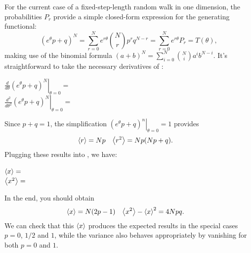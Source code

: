 For the current case of a fixed-step-length random walk in one dimension, the probabilities $P_r$ provide a simple closed-form expression for the generating functional:
\begin{equation}
  \label{eq:gen_func}
  \left(e^{\theta} p + q\right)^N = \sum_{r = 0}^N e^{r \theta} \binom{N}{r} p^r q^{N - r} = \sum_{r = 0}^N e^{r \theta} P_r = T(\theta),
\end{equation}
making use of the binomial formula $\left(a + b\right)^N = \sum_{i = 0}^N \binom{N}{i} a^i b^{N - i}$.
It's straightforward to take the necessary derivatives of :
\begin{mdframed}
  $\displaystyle \left.\frac{d}{d\theta} \left(e^{\theta} p + q\right)^N \right|_{\theta = 0} = $ \\[50 pt]
  $\displaystyle \left.\frac{d^2}{d\theta^2} \left(e^{\theta} p + q\right)^N \right|_{\theta = 0} = $ \\[50 pt]
\end{mdframed}
Since $p + q = 1$, the simplification $\left.\left(e^{\theta} p + q\right)^n \right|_{\theta = 0} = 1$ provides
\begin{align*}
  \left\langle r \right\rangle   & = Np &
  \left\langle r^2 \right\rangle & = Np(Np + q).
\end{align*}
\newpage %
\noindent Plugging these results into , we have:
\begin{mdframed}
  $\left\langle x \right\rangle   = $ \\[50 pt]
  $\left\langle x^2 \right\rangle = $ \\[50 pt]
\end{mdframed}
In the end, you should obtain
\begin{align}
  \label{eq:RWmean}
  \left\langle x \right\rangle & = N(2p - 1) &
  \left\langle x^2 \right\rangle - \left\langle x \right\rangle^2 & = 4Npq.
\end{align}
We can check that this $\left\langle x \right\rangle$ produces the expected results in the special cases $p = 0$, $1 / 2$ and $1$, while the variance also behaves appropriately by vanishing for both $p = 0$ and $1$.



